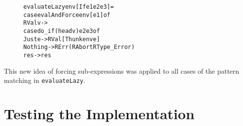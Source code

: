 \begin{figure}[H]
\begin{alltt}
  evaluateLazy env [If e1 e2 e3]   =
    case evalAndForce env [e1] of
      RVal v ->
        case do_if (head v) e2 e3 of
          Just e  -> RVal [Thunk env e]
          Nothing -> RErr (RAbort RType_Error)
      res -> res
\end{alltt}
\end{figure}

This new idea of forcing sub-expressions was applied to all cases of the
pattern matching in \texttt{evaluateLazy}.

\section{Testing the Implementation}
